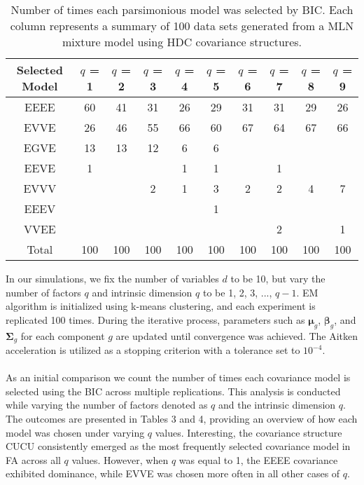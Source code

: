 \documentclass[11pt]{article}
\begin{document}
\begin {table}
\caption {Number of times each parsimonious model was selected by BIC. Each column represents a summary of 100 data sets generated from a MLN mixture model using HDC covariance structures.} \label{tab:title} 
\def\arraystretch{1.2}
\begin{center}
\begin{tabular}{ |c|c|c|c|c|c|c|c|c|c|} 
\hline
Selected Model& $q$ = 1 & $q$ = 2 & $q$ = 3 & $q$ = 4 & $q$ = 5 & $q$ = 6 & $q$ = 7 & $q$ = 8 & $q$ = 9 \\ 
\hline
EEEE & 60 & 41 & 31 & 26 & 29 & 31 & 31 & 29 & 26 \\
EVVE & 26 & 46 & 55 & 66 & 60 & 67 & 64 & 67 & 66 \\
EGVE & 13 & 13 & 12 & 6 & 6 & & & &  \\
EEVE & 1 & & & 1 & 1 & & 1 & & \\
EVVV & & & 2 & 1 & 3 & 2 & 2 & 4 & 7 \\
EEEV & & &  &  & 1 & &  &  & \\
VVEE & & &  &  &  & & 2 &  & 1 \\
\hline
Total& 100 & 100 & 100 & 100&100&100&100&100&100\\
\hline
\end{tabular}
\end{center}
\end {table} 
In our simulations, we fix the number of variables $d$ to be 10, but vary the number of factors $q$ and intrinsic dimension $q$ to be 1, 2, 3, ..., $q-1$. EM algorithm is initialized using k-means clustering, and each experiment is replicated 100 times. During the iterative process, parameters such as $\boldsymbol{\mu}_g$, $\boldsymbol{\beta}_g$, and $\boldsymbol{\Sigma}_g$ for each component $g$ are updated until convergence was achieved. The Aitken acceleration is utilized as a stopping criterion with a tolerance set to $10^{-4}$. \\
\\
As an initial comparison we count the number of times each covariance model is selected using the BIC across multiple replications. This analysis is conducted while varying the number of factors denoted as $q$ and the intrinsic dimension $q$. The outcomes are presented in Tables 3 and 4, providing an overview of how each model was chosen under varying $q$ values. Interesting, the covariance structure CUCU consistently emerged as the most frequently selected covariance model in FA across all $q$ values. However, when $q$ was equal to 1, the EEEE covariance exhibited dominance, while EVVE was chosen more often in all other cases of $q$.\\
\end{document}
